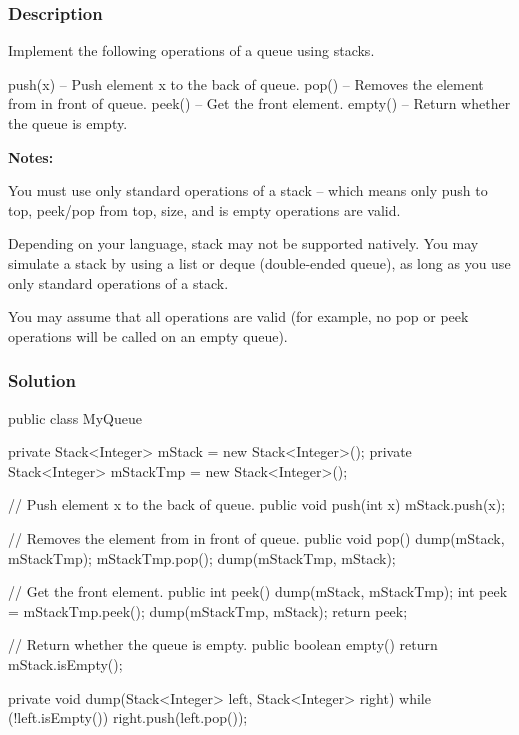 \subsubsection{Description}
Implement the following operations of a queue using stacks.
\begin{Code}
push(x) -- Push element x to the back of queue.
pop() -- Removes the element from in front of queue.
peek() -- Get the front element.
empty() -- Return whether the queue is empty.
\end{Code}

\textbf{Notes:}

You must use only standard operations of a stack -- which means only push to top, peek/pop from top, size, and is empty operations are valid.

Depending on your language, stack may not be supported natively. You may simulate a stack by using a list or deque (double-ended queue), as long as you use only standard operations of a stack.

You may assume that all operations are valid (for example, no pop or peek operations will be called on an empty queue).

\subsubsection{Solution}

\begin{Code}
public class MyQueue {

    private Stack<Integer> mStack = new Stack<Integer>();
    private Stack<Integer> mStackTmp = new Stack<Integer>();

    // Push element x to the back of queue.
    public void push(int x) {
        mStack.push(x);
    }

    // Removes the element from in front of queue.
    public void pop() {
        dump(mStack, mStackTmp);
        mStackTmp.pop();
        dump(mStackTmp, mStack);
    }

    // Get the front element.
    public int peek() {
        dump(mStack, mStackTmp);
        int peek = mStackTmp.peek();
        dump(mStackTmp, mStack);
        return peek;
    }

    // Return whether the queue is empty.
    public boolean empty() {
        return mStack.isEmpty();
    }

    private void dump(Stack<Integer> left, Stack<Integer> right) {
        while (!left.isEmpty()) {
            right.push(left.pop());
        }
    }
}

\end{Code}

